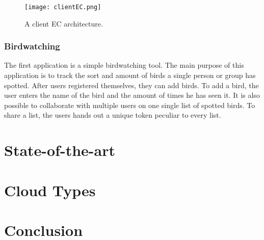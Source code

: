 \documentclass[a4paper,12pt]{report}
\begin{document}
\begin{figure}
    \small
    \centering
    \texttt{[image: clientEC.png]}
    \caption{A client EC architecture.}
    \label{fig:clientEC}
\end{figure}

\subsection{Birdwatching}

The first application is a simple birdwatching tool. The main purpose of this application is to track the sort and amount of birds a single person or group has spotted. After users registered themselves, they can add birds. To add a bird, the user enters the name of the bird and the amount of times he has seen it. It is also possible to collaborate with multiple users on one single list of spotted birds. To share a list, the users hands out a unique token peculiar to every list. 

\chapter{State-of-the-art} %
\chapter{Cloud Types} %
\chapter{Conclusion} %
\end{document}
